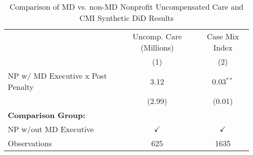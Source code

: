 \begin{table}[ht!]

\caption{\label{tab:MD_noMD_uncompCMI_synth}Comparison of MD vs. non-MD Nonprofit Uncompensated Care and CMI Synthetic DiD Results}
\centering
\begin{tabular}[t]{lcc}
\toprule
\multicolumn{1}{c}{ } & \multicolumn{1}{c}{Uncomp. Care (Millions)} & \multicolumn{1}{c}{Case Mix Index} \\
\cmidrule(l{3pt}r{3pt}){2-2} \cmidrule(l{3pt}r{3pt}){3-3}
 & (1) & (2)\\
\midrule
NP w/ MD Executive x Post Penalty & 3.12 & 0.03$^{**}$\\
 & (2.99) & (0.01)\\
\textbf{Comparison Group:} &  & \\
NP w/out MD Executive & $\checkmark$ & $\checkmark$\\
Observations & 625 & 1635\\
\bottomrule
\end{tabular}
\end{table}
